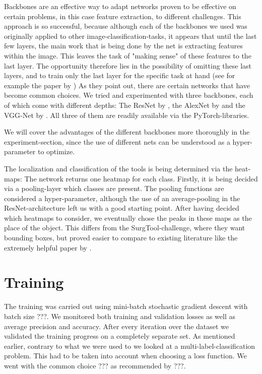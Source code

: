 Backbones are an effective way to adapt networks proven to be effective on certain problems, in this case feature extraction, to different challenges. This approach is so successful, because although each of the backbones we used was originally applied to other image-classification-tasks, it appears that until the last few layers, the main work that is being done by the net is extracting features within the image. This leaves the task of "making sense" of these features to the last layer. The opportunity therefore lies in the possibility of omitting these last layers, and to train only the last layer for the specific task at hand (see for example the paper by \cite{https://doi.org/10.48550/arxiv.2206.08016}) As they point out, there are certain networks that have become common choices.
We tried and experimented with three backbones, each of which come with different depths: The ResNet by \cite{https://doi.org/10.48550/arxiv.1512.03385}, the AlexNet by \cite{krizhevsky2017imagenet} and the VGG-Net by \cite{https://doi.org/10.48550/arxiv.1409.1556}.
All three of them are readily available via the PyTorch-libraries.

We will cover the advantages of the different backbones more thoroughly in the experiment-section, since the use of different nets can be understood as a hyper-parameter to optimize.

The localization and classification of the tools is being determined via the heat-maps: The network returns one heatmap for each class. Firstly, it is being decided via a pooling-layer which classes are present. The pooling functions are considered a hyper-parameter, although the use of an average-pooling in the ResNet-architecture left us with a good starting point. After having decided which heatmaps to consider, we eventually chose the peaks in these maps as the place of the object. This differs from the SurgTool-challenge, where they want bounding boxes, but proved easier to compare to existing literature like the extremely helpful paper by \cite{Vardazaryan}.

\section{Training}

The training was carried out using mini-batch stochastic gradient descent with batch size ???. We monitored both training and validation losses as well as average precision and accuracy.  After every iteration over the dataset we validated the training progress on a completely separate set.
As mentioned earlier, contrary to what we were used to we looked at a multi-label-classification problem. This had to be taken into account when choosing a loss function. We went with the common choice ??? as recommended by  ???.


